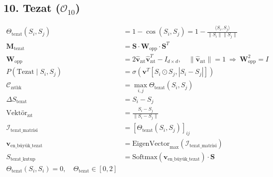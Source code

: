 \documentclass[11pt, a4paper]{article}
\begin{document}
\subsection{10. Tezat ($\mathcal{O}_{10}$)}
\begin{align}
\Theta_{\text{tezat}}(S_i, S_j) &= 1 - \cos(S_i, S_j) = 1 - \frac{\langle S_i, S_j \rangle}{\|S_i\| \|S_j\|} \\
\mathbf{M}_{\text{tezat}} &= \mathbf{S} \cdot \mathbf{W}_{\text{opp}} \cdot \mathbf{S}^T \\
\mathbf{W}_{\text{opp}} &= 2\hat{\mathbf{v}}_{\text{zıt}} \hat{\mathbf{v}}_{\text{zıt}}^T - I_{d \times d}, \quad \|\hat{\mathbf{v}}_{\text{zıt}}\| = 1 \ \Rightarrow \ \mathbf{W}_{\text{opp}}^2 = I \\
P(\text{Tezat} \mid S_i, S_j) &= \sigma\left( \mathbf{v}^T [S_i \odot S_j, |S_i - S_j|] \right) \\
\mathcal{C}_{\text{zıtlık}} &= \max_{i,j} \Theta_{\text{tezat}}(S_i, S_j) \\
\Delta S_{\text{tezat}} &= S_i - S_j \\
\text{Vektör}_{\text{zıt}} &= \frac{S_i - S_j}{\|S_i - S_j\|} \\
\mathcal{I}_{\text{tezat\_matrisi}} &= \left[ \Theta_{\text{tezat}}(S_i, S_j) \right]_{ij} \\
\mathbf{v}_{\text{en\_büyük\_tezat}} &= \text{EigenVector}_{\max}(\mathcal{I}_{\text{tezat\_matrisi}}) \\
S_{\text{tezat\_kutup}} &= \text{Softmax}(\mathbf{v}_{\text{en\_büyük\_tezat}}) \cdot \mathbf{S} \\
\Theta_{\text{tezat}}(S_i, S_i) = 0, \quad \Theta_{\text{tezat}} \in [0, 2]
\end{align}
\end{document}
